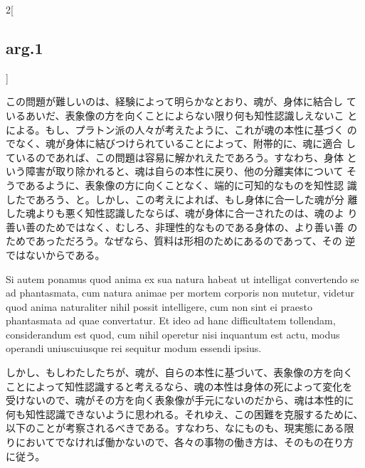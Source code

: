 \documentclass[paper=a4paper,fontsize=10pt,jafontsize=9pt,titlepage]{jlreq}
\begin{document}
\begin{paracol}{2}[\subsection{arg.1}]
\switchcolumn

この問題が難しいのは、経験によって明らかなとおり、魂が、身体に結合し
ているあいだ、表象像の方を向くことによらない限り何も知性認識しえないこ
とによる。もし、プラトン派の人々が考えたように、これが魂の本性に基づく
のでなく、魂が身体に結びつけられていることによって、附帯的に、魂に適合
しているのであれば、この問題は容易に解かれえたであろう。すなわち、身体
という障害が取り除かれると、魂は自らの本性に戻り、他の分離実体について
そうであるように、表象像の方に向くことなく、端的に可知的なものを知性認
識したであろう、と。しかし、この考えによれば、もし身体に合一した魂が分
離した魂よりも悪く知性認識したならば、魂が身体に合一されたのは、魂のよ
り善い善のためではなく、むしろ、非理性的なものである身体の、より善い善
のためであっただろう。なぜなら、質料は形相のためにあるのであって、その
逆ではないからである。

\switchcolumn*

Si autem ponamus quod anima ex sua natura habeat ut intelligat
convertendo se ad phantasmata, cum natura animae per mortem corporis
non mutetur, videtur quod anima naturaliter nihil possit intelligere,
cum non sint ei praesto
phantasmata ad quae convertatur. Et ideo ad hanc difficultatem
tollendam, considerandum est quod, cum nihil operetur nisi inquantum
est actu, modus operandi uniuscuiusque rei sequitur modum essendi
ipsius.

\switchcolumn

しかし、もしわたしたちが、魂が、自らの本性に基づいて、表象像の方を向く
ことによって知性認識すると考えるなら、魂の本性は身体の死によって変化を
受けないので、魂がその方を向く表象像が手元にないのだから、魂は本性的に
何も知性認識できないように思われる。それゆえ、この困難を克服するために、
以下のことが考察されるべきである。すなわち、なにものも、現実態にある限
りにおいてでなければ働かないので、各々の事物の働き方は、そのもの在り方
に従う。


\end{paracol}
\end{document}
